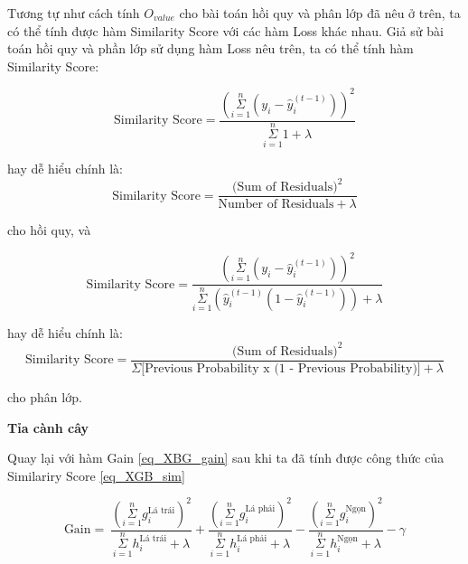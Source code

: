     Tương tự như cách tính $O_{value}$ cho bài toán hồi quy và phân lớp đã nêu ở trên, ta có thể tính được hàm Similarity Score với các hàm Loss khác nhau. Giả sử bài toán hồi quy và phần lớp sử dụng hàm Loss nêu trên, ta có thể tính hàm Similarity Score:
    
    \begin{equation}
        \text{Similarity Score} = \frac{(\underset{i=1}{\overset{n}{\Sigma}} (y_{i} - \hat{y}_{i}^{(t-1)}))^2}
        {\underset{i=1}{\overset{n}{\Sigma}}1 + \lambda}
    \end{equation}
    
    hay dễ hiểu chính là: \cite{starmer_2020_XGB}
    \begin{equation}
        \text{Similarity Score} = \frac{\text{(Sum of Residuals)}^2}
        {\text{Number of Residuals} + \lambda}
    \end{equation}
    
    cho hồi quy, và
    
    \begin{equation}
        \text{Similarity Score} = \frac{(\underset{i=1}{\overset{n}{\Sigma}} (y_{i} - \hat{y}_{i}^{(t-1)}))^2}
        {\underset{i=1}{\overset{n}{\Sigma}}(\hat{y}_{i}^{(t-1)}(1 - \hat{y}_{i}^{(t-1)})) + \lambda}
    \end{equation}
    
    hay dễ hiểu chính là: \cite{starmer_2020_XGB}
    \begin{equation}
        \text{Similarity Score} = \frac{\text{(Sum of Residuals)}^2}
        {\Sigma\text{[Previous Probability x (1 - Previous Probability)]} + \lambda}
    \end{equation}
    
    cho phân lớp.
    
    \bigbreak
    
    \textbf{Tỉa cành cây}
    
    Quay lại với hàm Gain \eqref{eq_XBG_gain} sau khi ta đã tính được công thức của Similariry Score \eqref{eq_XGB_sim}
    
    \begin{equation} \label{eq_XGB_Gain_final}
        \text{Gain} = \: \frac{(\underset{i=1}{\overset{n}{\Sigma}} g^{\text{Lá trái}}_{i})^2} {\underset{i=1}{\overset{n}{\Sigma}} h^{\text{Lá trái}}_{i} + \lambda} 
        + \frac{(\underset{i=1}{\overset{n}{\Sigma}} g^{\text{Lá phải}}_{i})^2} {\underset{i=1}{\overset{n}{\Sigma}} h^{\text{Lá phải}}_{i} + \lambda} 
        - \frac{(\underset{i=1}{\overset{n}{\Sigma}} g^{\text{Ngọn}}_{i})^2} {\underset{i=1}{\overset{n}{\Sigma}} h^{\text{Ngọn}}_{i} + \lambda} - \gamma
    \end{equation}
    
